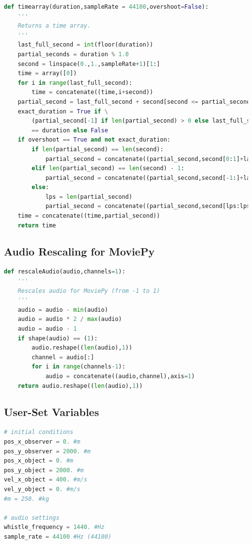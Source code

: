 \documentclass[%
 reprint,
 amsmath,amssymb,
 aps,
]{revtex4-1}
\begin{document}
\begin{lstlisting}[label=lst:timearr,language=Python]
def timearray(duration,sampleRate = 44100,overshoot=False):
    '''
    Returns a time array.
    '''
    last_full_second = int(floor(duration))
    partial_seconds = duration % 1.0
    second = linspace(0.,1.,sampleRate+1)[1:]
    time = array([0])
    for i in range(last_full_second): 
        time = concatenate((time,i+second))
    partial_second = last_full_second + second[second <= partial_seconds]
    exact_duration = True if \
        (partial_second[-1] if len(partial_second) > 0 else last_full_second)\
        == duration else False
    if overshoot == True and not exact_duration:
        if len(partial_second) == len(second):
            partial_second = concatenate((partial_second,second[0:1]+last_full_second+1))
        elif len(partial_second) == len(second) - 1:
            partial_second = concatenate((partial_second,second[-1:]+last_full_second))
        else:
            lps = len(partial_second)
            partial_second = concatenate((partial_second,second[lps:lps+1]+last_full_second))
    time = concatenate((time,partial_second))
    return time
\end{lstlisting}

\subsection{\label{sec:coderescale}Audio Rescaling for MoviePy}

\begin{lstlisting}[label=lst:rescale,language=Python]
def rescaleAudio(audio,channels=1):
    '''
    Rescales audio for MoviePy (from -1 to 1)
    '''
    audio = audio - min(audio)
    audio = audio * 2 / max(audio)
    audio = audio - 1
    if shape(audio) == (1):
        audio.reshape((len(audio),1))
        channel = audio[:]
        for i in range(channels-1):
            audio = concatenate((audio,channel),axis=1)
    return audio.reshape((len(audio),1))
\end{lstlisting}

\subsection{\label{sec:codeuservars}User-Set Variables}

\begin{lstlisting}[label=lst:uservars,language=Python]
# initial conditions
pos_x_observer = 0. #m
pos_y_observer = 2000. #m
pos_x_object = 0. #m
pos_y_object = 2000. #m
vel_x_object = 400. #m/s
vel_y_object = 0. #m/s
#m = 250. #kg

# audio settings
whistle_frequency = 1440. #Hz
sample_rate = 44100 #Hz (44100)
\end{lstlisting}
\end{document}
